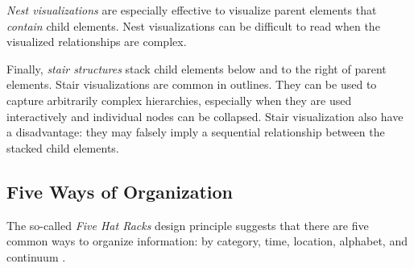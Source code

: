 \emph{Nest visualizations} are especially effective to visualize parent elements that \emph{contain} child elements. Nest visualizations can be difficult to read when the visualized relationships are complex.

Finally, \emph{stair structures} stack child elements below and to the right of parent elements. Stair visualizations are common in outlines. They can be used to capture arbitrarily complex hierarchies, especially when they are used interactively and individual nodes can be collapsed. Stair visualization also have a disadvantage: they may falsely imply a sequential relationship between the stacked child elements.

\subsection{Five Ways of Organization}
\label{sec:fivehatracks}

The so-called \emph{Five Hat Racks} design principle suggests that there are five common ways to organize information: by category, time, location, alphabet, and continuum \cite{Lidwell10}.

